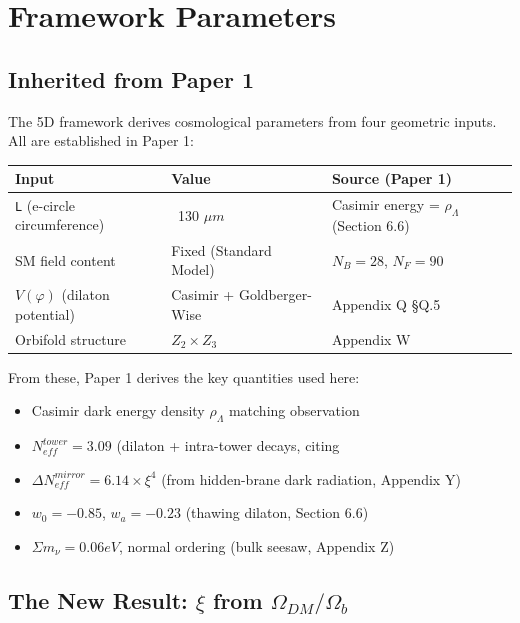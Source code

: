 \documentclass[aps,prd,preprint,superscriptaddress,longbibliography]{revtex4-2}
\begin{document}
\section{Framework Parameters}


\subsection{Inherited from Paper 1}

The 5D framework derives cosmological parameters from four geometric inputs. All are established in Paper 1:


\begin{table}[H]
\begin{ruledtabular}
\begin{tabular}{p{5.0cm}p{5.0cm}p{5.0cm}}
Input & Value & Source (Paper 1) \\
\hline
\texttt{L} (e-circle circumference) & ~130 $\mu m$ & Casimir energy = $\rho_\Lambda$ (Section 6.6) \\
SM field content & Fixed (Standard Model) & $N_B = 28$, $N_F = 90$ \\
$V(\varphi)$ (dilaton potential) & Casimir + Goldberger-Wise & Appendix Q \S{}Q.5 \\
Orbifold structure & $Z_{2} \times Z_{3}$ & Appendix W \\
\end{tabular}
\end{ruledtabular}
\end{table}

From these, Paper 1 derives the key quantities used here:

\begin{itemize}
  \item Casimir dark energy density $\rho_\Lambda$ matching observation
  \item $N_{eff}^{tower} = 3.09$ (dilaton + intra-tower decays, citing \cite{GonzaloNeutrinoTowers2024}
  \item $\Delta N_{eff}^{mirror} = 6.14 \times \xi^{4}$ (from hidden-brane dark radiation, Appendix Y)
  \item $w_{0} = -0.85$, $w_a = -0.23$ (thawing dilaton, Section 6.6)
  \item $\Sigma m_\nu = 0.06 eV$, normal ordering (bulk seesaw, Appendix Z)
\end{itemize}


\subsection{The New Result: $\xi$ from $\Omega_{DM}/\Omega_b$}
\end{document}
